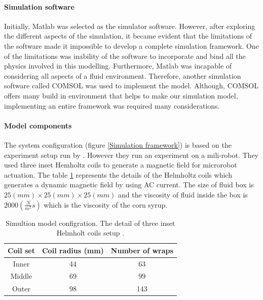\documentclass[12pt,a4paper,titlepage]{report}
\newcommand{\head}[1]{\textnormal{\textbf{#1}}}
\begin{document}
\paragraph{Simulation software}
Initially, Matlab was selected as the simulator software. However, after exploring the different aspects
 of the simulation, it became evident that the limitations of the software made it impossible to develop a complete simulation
 framework. One of the limitations was inability of the software to incorporate and bind all the physics involved in this  
modelling. Furthermore, Matlab was incapable of considering all aspects of a fluid environment. Therefore, 
another simulation software called COMSOL was used to implement the model. Although, COMSOL offers 
many build in environment that helps to make our simulation model, implementing an entire framework was 
required many considerations. 

\paragraph{Model components}

 The system configuration (figure \ref{Simulation framework}) is based on the experiment setup
run by \citeauthor{mahoney2011velocity}. However they run an experiment on a mili-robot. They used three inset Hemholtz
coils to generate a magnetic field for microrobot actuation. 
The table \ref{Simultion model configration} represents the details 
of the Helmholtz coils which generates a dynamic magnetic field by using AC current. The size of 
fluid box is $25 (mm) \times 25(mm) \times 25 (mm)$ and the viscosity of fluid inside the box is $2000 (\frac{N}{m^2} s)$
which is the viscosity of the corn syrup. 





\begin{table}[!ht]

\centering%
{
\begin{tabular}{c c c }%
\toprule[2.0pt]



\head{Coil set} & \head{Coil radius (mm)} & \head{Number of wraps} \\

\midrule
Inner 	& 	    	44	  & 	63		\\%
Middle	& 	69		  & 	99	\\
Outer & 	98 		  & 	143	\\[1ex]%



\bottomrule[2.0pt]
\end{tabular}
}
\label{Simultion model configration}%
\caption[Simultion model configration]{Simultion model configration. The detail of three inset Helmholt coils setup
\citep{mahoney2011velocity}.}\label{Simultion model configration}%
\end{table}
\end{document}
